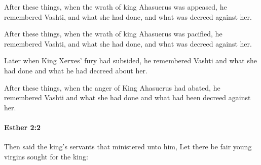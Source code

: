 			After these things, when the wrath of king Ahasuerus was appeased, he remembered Vashti, and what she had done, and what was decreed against her.

			\begin{versebox}
					\item[BHS] 
					\item[LXX] 
					\item[ASV] After these things, when the wrath of king Ahasuerus was pacified, he remembered Vashti, and what she had done, and what was decreed against her.
					\item[NIV] Later when King Xerxes’ fury had subsided, he remembered Vashti and what she had done and what he had decreed about her.
					\item[NRSV] After these things, when the anger of King Ahasuerus had abated, he remembered Vashti and what she had done and what had been decreed against her.
			\end{versebox}

		\paragraph{Esther 2:2} %
			\label{ESTHER-2-2}

			Then said the king’s servants that ministered unto him, Let there be fair young virgins sought for the king:

